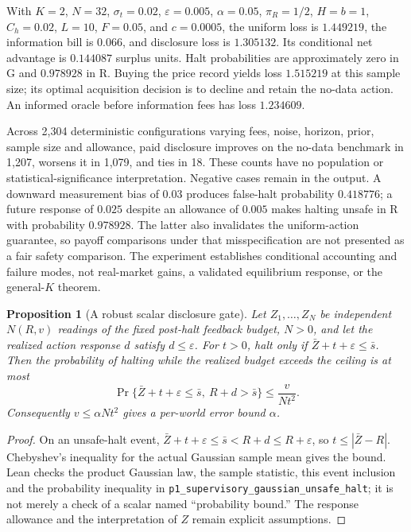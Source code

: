 \documentclass[12pt]{article}
\newtheorem{proposition}[theorem]{Proposition}
\theoremstyle{definition}
\theoremstyle{remark}
\begin{document}
With $K=2$, $N=32$, $\sigma_t=0.02$, $\varepsilon=0.005$, $\alpha=0.05$, $\pi_R=1/2$, $H=b=1$, $C_h=0.02$, $L=10$, $F=0.05$, and $c=0.0005$, the uniform loss is $1.449219$, the information bill is $0.066$, and disclosure loss is $1.305132$. Its conditional net advantage is $0.144087$ surplus units. Halt probabilities are approximately zero in G and $0.978928$ in R. Buying the price record yields loss $1.515219$ at this sample size; its optimal acquisition decision is to decline and retain the no-data action. An informed oracle before information fees has loss $1.234609$.

Across 2,304 deterministic configurations varying fees, noise, horizon, prior, sample size and allowance, paid disclosure improves on the no-data benchmark in 1,207, worsens it in 1,079, and ties in 18. These counts have no population or statistical-significance interpretation. Negative cases remain in the output. A downward measurement bias of $0.03$ produces false-halt probability $0.418776$; a future response of $0.025$ despite an allowance of $0.005$ makes halting unsafe in R with probability $0.978928$. The latter also invalidates the uniform-action guarantee, so payoff comparisons under that misspecification are not presented as a fair safety comparison. The experiment establishes conditional accounting and failure modes, not real-market gains, a validated equilibrium response, or the general-$K$ theorem.

\begin{proposition}[A robust scalar disclosure gate]\label{prop:robust_gate}
Let $Z_1,\ldots,Z_N$ be independent $N(R,v)$ readings of the fixed post-halt feedback budget, $N>0$, and let the realized action response $d$ satisfy $d\le\varepsilon$. For $t>0$, halt only if $\bar Z+t+\varepsilon\le\bar s$. Then the probability of halting while the realized budget exceeds the ceiling is at most
\[
 \Pr\{\bar Z+t+\varepsilon\le\bar s,\ R+d>\bar s\}
 \le \frac{v}{Nt^2}.
\]
Consequently $v\le\alpha Nt^2$ gives a per-world error bound $\alpha$.
\end{proposition}
\begin{proof}
On an unsafe-halt event, $\bar Z+t+\varepsilon\le\bar s<R+d\le R+\varepsilon$, so $t\le|\bar Z-R|$. Chebyshev's inequality for the actual Gaussian sample mean gives the bound. Lean checks the product Gaussian law, the sample statistic, this event inclusion and the probability inequality in \nolinkurl{p1_supervisory_gaussian_unsafe_halt}; it is not merely a check of a scalar named ``probability bound.'' The response allowance and the interpretation of $Z$ remain explicit assumptions.
\end{proof}
\end{document}
